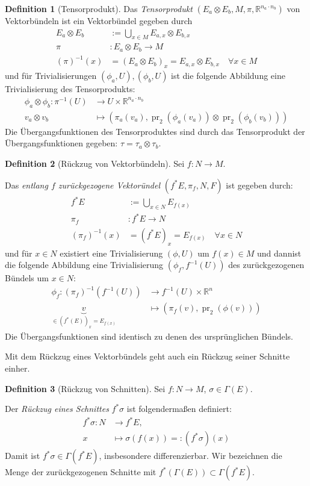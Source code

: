 \documentclass[a4paper]{scrreprt}
\numberwithin{equation}{chapter}
\DeclareMathOperator{\pr}{pr}
\newcommand{\R}{\mathbb{R}}
\theoremstyle{definition}
\newtheorem{defn}{Definition}[section]
\begin{document}
		\begin{defn}[Tensorprodukt]
			Das \emph{Tensorprodukt} $(E_a\otimes E_b ,M,\pi,\R^{n_a\cdot n_b})$ von Vektorbündeln ist ein Vektorbündel gegeben durch
			\begin{align*}
				E_a\otimes E_b&:=\bigcup_{x\in M}E_{a,x}\otimes E_{b,x}\\
				\pi&\colon E_a\otimes E_b\rightarrow M\\
				(\pi)^{-1}(x)&=(E_a\otimes E_b)_x=E_{a,x}\otimes E_{b,x}\quad \forall x\in M
			\end{align*}
			und für Trivialisierungen $(\phi_a,U),(\phi_b,U)$ ist die folgende Abbildung eine Trivialisierung des Tensorprodukts:
			\begin{align*}
				\phi_a\otimes\phi_b\colon\pi^{-1}(U)&\rightarrow U\times \R^{n_a\cdot n_b}\\
				v_a\otimes v_b&\mapsto (\pi_a(v_a), \pr_2(\phi_a(v_a))\otimes\pr_2(\phi_b(v_b)))
			\end{align*}
			Die Übergangsfunktionen des Tensorproduktes sind durch das Tensorprodukt der Übergangsfunktionen gegeben: $\tau=\tau_a\otimes\tau_b$.
		\end{defn}
		\begin{defn}[Rückzug von Vektorbündeln]
			Sei $f\colon N\rightarrow M$.
			
			Das \emph{entlang $f$ zurückgezogene Vektoründel} $(f^*E,\pi_f,N, F)$ ist gegeben durch:
			\begin{align*}
				f^*E&:=\bigcup _{x\in N} E_{f(x)}\\
				\pi_f&\colon f^*E\rightarrow N\\
				(\pi_f)^{-1}(x)&=(f^*E)_x=E_{f(x)}\quad\forall x\in N
			\end{align*}
			und für $x\in N$ existiert eine Trivialisierung $(\phi,U)$ um $f(x)\in M$ und dannist die folgende Abbildung eine Trivialisierung $(\phi_f,f^{-1}(U))$ des zurückgezogenen Bündels um $x\in N$:
			\begin{align*}
				\phi_f \colon (\pi_f)^{-1}(f^{-1}(U))&\rightarrow f^{-1}(U)\times\R^n\\
				\underbrace{v}_{\in (f^*(E))_x=E_{f(x)}}&\mapsto (\pi_f(v),\pr_2(\phi(v)))
			\end{align*}
			Die Übergangsfunktionen sind identisch zu denen des ursprünglichen Bündels.
		\end{defn}
		Mit dem Rückzug eines Vektorbündels geht auch ein Rückzug seiner Schnitte einher.
		\begin{defn}[Rückzug von Schnitten]
			Sei $f:N\rightarrow M$, $\sigma\in\Gamma(E)$.
			
			Der \emph{Rückzug eines Schnittes} $f^*\sigma$ ist folgendermaßen definiert:
			\begin{align*}
				f^*\sigma\colon N &\rightarrow f^*E,\\
				x &\mapsto \sigma(f(x))=: (f^*\sigma)(x)
			\end{align*}
			Damit ist $f^*\sigma\in\Gamma(f^*E)$, insbesondere differenzierbar. Wir bezeichnen die Menge der zurückgezogenen Schnitte mit $f^*(\Gamma(E))\subset\Gamma(f^*E)$.
		\end{defn}
\end{document}
